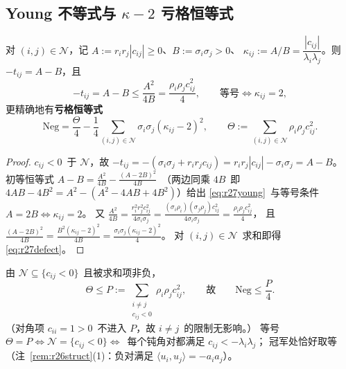 \subsection{Young 不等式与 $\kappa-2$ 亏格恒等式}\label{sec:r27:young}

\begin{lemma}\label{lem:r27young}
对 $(i,j)\in\mathcal N$，记 $A:=r_ir_j|c_{ij}|\ge0$、$B:=\sigma_i\sigma_j>0$、
$\kappa_{ij}:=A/B=\dfrac{|c_{ij}|}{\lambda_i\lambda_j}$。则 $-t_{ij}=A-B$，且
\begin{equation}\label{eq:r27young}
-t_{ij}=A-B\le\frac{A^2}{4B}=\frac{\rho_i\rho_jc_{ij}^2}{4},
\qquad\text{等号}\iff\kappa_{ij}=2,
\end{equation}
更精确地有\textbf{亏格恒等式}
\begin{equation}\label{eq:r27defect}
\mathrm{Neg}=\frac\Theta4-\frac14\sum_{(i,j)\in\mathcal N}\sigma_i\sigma_j(\kappa_{ij}-2)^2,
\qquad
\Theta:=\sum_{(i,j)\in\mathcal N}\rho_i\rho_jc_{ij}^2 .
\end{equation}
\end{lemma}

\begin{proof}
$c_{ij}<0$~于 $\mathcal N$，故 $-t_{ij}=-(\sigma_i\sigma_j+r_ir_jc_{ij})=r_ir_j|c_{ij}|-\sigma_i\sigma_j=A-B$。
初等恒等式 $A-B=\frac{A^2}{4B}-\frac{(A-2B)^2}{4B}$~（两边同乘 $4B$~即
$4AB-4B^2=A^2-(A^2-4AB+4B^2)$）给出 \eqref{eq:r27young}~与等号条件 $A=2B\iff\kappa_{ij}=2$。
又 $\frac{A^2}{4B}=\frac{r_i^2r_j^2c_{ij}^2}{4\sigma_i\sigma_j}
=\frac{(\sigma_i\rho_i)(\sigma_j\rho_j)c_{ij}^2}{4\sigma_i\sigma_j}=\frac{\rho_i\rho_jc_{ij}^2}4$，
且 $\frac{(A-2B)^2}{4B}=\frac{B^2(\kappa_{ij}-2)^2}{4B}=\frac{\sigma_i\sigma_j(\kappa_{ij}-2)^2}4$。
对 $(i,j)\in\mathcal N$~求和即得 \eqref{eq:r27defect}。
\end{proof}

\begin{corollary}\label{cor:r27P}
由 $\mathcal N\subseteq\{c_{ij}<0\}$~且被求和项非负，
\begin{equation}\label{eq:r27Pdef}
\Theta\le P:=\!\!\sum_{\substack{i\ne j\\ c_{ij}<0}}\!\!\rho_i\rho_jc_{ij}^2,
\qquad\text{故}\qquad
\mathrm{Neg}\le\frac P4 .
\end{equation}
（对角项 $c_{ii}=1>0$~不进入 $P$，故 $i\ne j$~的限制无影响。）
等号 $\Theta=P\iff\mathcal N=\{c_{ij}<0\}\iff$~每个钝角对都满足 $c_{ij}<-\lambda_i\lambda_j$；
冠军处恰好取等（注~\ref{rem:r26struct}(1)：负对满足 $\langle u_i,u_j\rangle=-a_ia_j$）。
\end{corollary}

